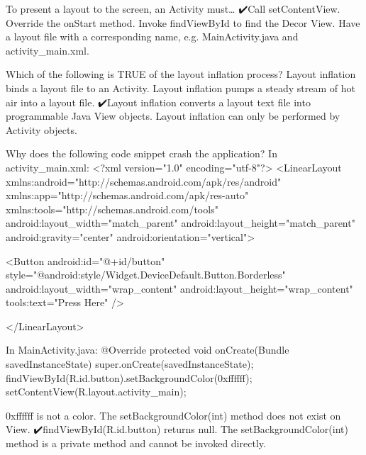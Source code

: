         To present a layout to the screen, an Activity must…
            ✔️Call setContentView.
            Override the onStart method.
            Invoke findViewById to find the Decor View.
            Have a layout file with a corresponding name, e.g. MainActivity.java and activity_main.xml.

        Which of the following is TRUE of the layout inflation process?
            Layout inflation binds a layout file to an Activity.
            Layout inflation pumps a steady stream of hot air into a layout file.
            ✔️Layout inflation converts a layout text file into programmable Java View objects.
            Layout inflation can only be performed by Activity objects.

        Why does the following code snippet crash the application?
            In activity_main.xml:
                <?xml version="1.0" encoding="utf-8"?>
                <LinearLayout xmlns:android="http://schemas.android.com/apk/res/android"
                    xmlns:app="http://schemas.android.com/apk/res-auto"
                    xmlns:tools="http://schemas.android.com/tools"
                    android:layout_width="match_parent"
                    android:layout_height="match_parent"
                    android:gravity="center"
                    android:orientation="vertical">
                
                    <Button
                        android:id="@+id/button"
                        style="@android:style/Widget.DeviceDefault.Button.Borderless"
                        android:layout_width="wrap_content"
                        android:layout_height="wrap_content"
                        tools:text="Press Here" />
                
                </LinearLayout>

            In MainActivity.java:
                @Override
                    protected void onCreate(Bundle savedInstanceState) {
                        super.onCreate(savedInstanceState);
                        findViewById(R.id.button).setBackgroundColor(0xffffff);
                        setContentView(R.layout.activity_main);
                    }

                    0xffffff is not a color.
                    The setBackgroundColor(int) method does not exist on View.
                    ✔️findViewById(R.id.button) returns null.
                    The setBackgroundColor(int) method is a private method and cannot be invoked directly.